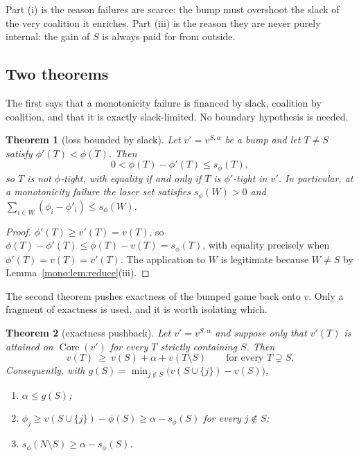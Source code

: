 \documentclass[11pt]{article}
\newtheorem{theorem}{Theorem}
\newcommand{\core}{\operatorname{Core}}
\begin{document}
Part (i) is the reason failures are scarce: the bump must overshoot the slack
of the very coalition it enriches.  Part (iii) is the reason they are never
purely internal: the gain of $S$ is always paid for from outside.

\subsection{Two theorems}

The first says that a monotonicity failure is financed by slack, coalition by
coalition, and that it is exactly slack-limited.  No boundary hypothesis is
needed.

\begin{theorem}[loss bounded by slack]\label{mono:thm:loss}
Let $v'=v^{S,\alpha}$ be a bump and let $T\ne S$ satisfy
$\phi'(T)<\phi(T)$.  Then
\[
 0<\phi(T)-\phi'(T)\le s_\phi(T),
\]
so $T$ is not $\phi$-tight, with equality if and only if $T$ is
$\phi'$-tight in $v'$.  In particular, at a monotonicity failure the loser
set satisfies $s_\phi(W)>0$ and
$\sum_{i\in W}(\phi_i-\phi'_i)\le s_\phi(W)$.
\end{theorem}

\begin{proof}
$\phi'(T)\ge v'(T)=v(T)$, so $\phi(T)-\phi'(T)\le\phi(T)-v(T)=s_\phi(T)$,
with equality precisely when $\phi'(T)=v(T)=v'(T)$.  The application to $W$
is legitimate because $W\ne S$ by Lemma~\ref{mono:lem:reduce}(iii).
\end{proof}

The second theorem pushes exactness of the bumped game back onto $v$.  Only a
fragment of exactness is used, and it is worth isolating which.

\begin{theorem}[exactness pushback]\label{mono:thm:push}
Let $v'=v^{S,\alpha}$ and suppose only that $v'(T)$ is attained on
$\core(v')$ for every $T$ strictly containing $S$.  Then
\[
 v(T)\ \ge\ v(S)+\alpha+v(T\setminus S)\qquad\text{for every }T\supsetneq S .
\]
Consequently, with $g(S)=\min_{j\notin S}\bigl(v(S\cup\{j\})-v(S)\bigr)$,
\begin{enumerate}[nosep,label=(\roman*)]
\item $\alpha\le g(S)$;
\item $\phi_j\ge v(S\cup\{j\})-\phi(S)\ge\alpha-s_\phi(S)$ for every
      $j\notin S$;
\item $s_\phi(N\setminus S)\ge\alpha-s_\phi(S)$.
\end{enumerate}
\end{theorem}
\end{document}
